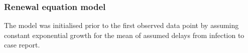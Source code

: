 % 
% 
% 
% 

\hypertarget{renewal-equation-model}{%
\subsubsection{Renewal equation model}\label{renewal-equation-model}}

The model was initialised prior to the first observed data point by assuming constant exponential growth for the mean of assumed delays from infection to case report.

